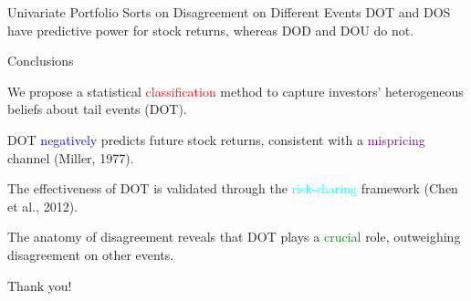 \documentclass[11pt, aspectratio=169]{beamer}
\newenvironment{wideitemize}{\itemize\addtolength{\itemsep}{10pt}}{\enditemize}
\begin{document}
\begin{frame}{Univariate Portfolio Sorts on Disagreement on Different Events}
DOT and DOS have predictive power for stock returns, whereas DOD and DOU do not.\\
\bigskip
{}
\end{frame}




\begin{frame}{Conclusions}
\begin{wideitemize}
    \item We propose a statistical \textcolor{red}{classification} method to capture investors' heterogeneous beliefs about tail events (DOT).
    \item DOT \textcolor{blue}{negatively} predicts future stock returns, consistent with a \textcolor{purple}{mispricing} channel (Miller, 1977).
    \item The effectiveness of DOT is validated through the \textcolor{cyan}{risk-sharing} framework (Chen et al., 2012).
    \item The anatomy of disagreement reveals that DOT plays a \textcolor{green}{crucial} role, outweighing disagreement on other events.
\end{wideitemize}
\end{frame}

\begin{frame}
    \begin{center}
        {\Huge Thank you!}  %
    \end{center}
\end{frame}
\end{document}
